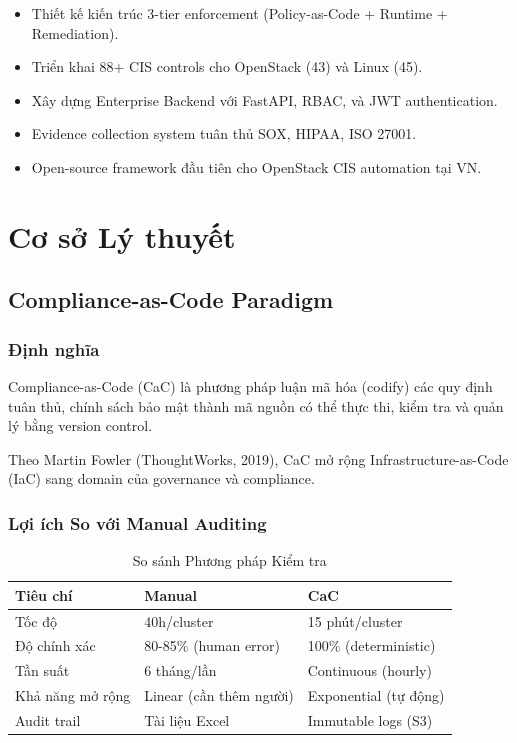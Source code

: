 \documentclass[12pt,a4paper]{report}
\begin{document}
\begin{itemize}
    \item Thiết kế kiến trúc 3-tier enforcement (Policy-as-Code + Runtime + Remediation).
    \item Triển khai 88+ CIS controls cho OpenStack (43) và Linux (45).
    \item Xây dựng Enterprise Backend với FastAPI, RBAC, và JWT authentication.
    \item Evidence collection system tuân thủ SOX, HIPAA, ISO 27001.
    \item Open-source framework đầu tiên cho OpenStack CIS automation tại VN.
\end{itemize}

\chapter{Cơ sở Lý thuyết}

\section{Compliance-as-Code Paradigm}

\subsection{Định nghĩa}

Compliance-as-Code (CaC) là phương pháp luận mã hóa (codify) các quy định tuân thủ, chính sách bảo mật thành mã nguồn có thể thực thi, kiểm tra và quản lý bằng version control.

Theo Martin Fowler (ThoughtWorks, 2019), CaC mở rộng Infrastructure-as-Code (IaC) sang domain của governance và compliance.

\subsection{Lợi ích So với Manual Auditing}

\begin{table}[h]
\centering
\caption{So sánh Phương pháp Kiểm tra}
\begin{tabular}{|l|p{5cm}|p{5cm}|}
\hline
\textbf{Tiêu chí} & \textbf{Manual} & \textbf{CaC} \\
\hline
Tốc độ & 40h/cluster & 15 phút/cluster \\
Độ chính xác & 80-85\% (human error) & 100\% (deterministic) \\
Tần suất & 6 tháng/lần & Continuous (hourly) \\
Khả năng mở rộng & Linear (cần thêm người) & Exponential (tự động) \\
Audit trail & Tài liệu Excel & Immutable logs (S3) \\
\hline
\end{tabular}
\end{table}
\end{document}
